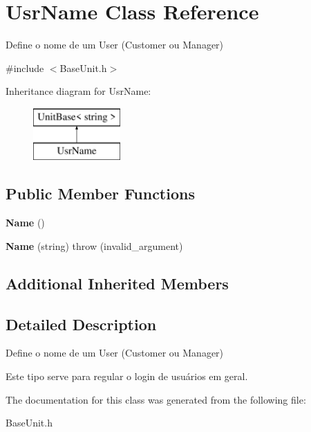\hypertarget{classUsrName}{\section{Usr\-Name Class Reference}
\label{classUsrName}
}


Define o nome de um User (Customer ou Manager)  




{\ttfamily \#include $<$Base\-Unit.\-h$>$}

Inheritance diagram for Usr\-Name\-:\begin{figure}[H]
\begin{center}
\leavevmode
\includegraphics[height=2.000000cm]{classUsrName}
\end{center}
\end{figure}
\subsection*{Public Member Functions}
\begin{DoxyCompactItemize}
\item 
\hypertarget{classUsrName_a1b08302bcdce4624efc4283717bf0156}{{\bfseries Name} ()}\label{classUsrName_a1b08302bcdce4624efc4283717bf0156}

\item 
\hypertarget{classUsrName_aa28a3613ce9157f86f56cd038d288df2}{{\bfseries Name} (string)  throw (invalid\-\_\-argument)}\label{classUsrName_aa28a3613ce9157f86f56cd038d288df2}

\end{DoxyCompactItemize}
\subsection*{Additional Inherited Members}


\subsection{Detailed Description}
Define o nome de um User (Customer ou Manager) 

Este tipo serve para regular o login de usuários em geral. 

The documentation for this class was generated from the following file\-:\begin{DoxyCompactItemize}
\item 
Base\-Unit.\-h\end{DoxyCompactItemize}
